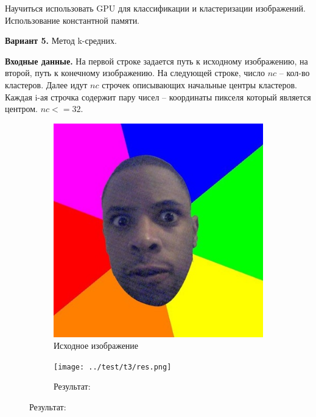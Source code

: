 \documentclass[12pt]{article}
\begin{document}


Научиться использовать GPU для классификации и
кластеризации изображений. Использование константной памяти.

\textbf{Вариант 5.} Метод k-средних.

\textbf{Входные данные.}
На первой строке задается путь к исходному изображению,
на второй, путь к конечному изображению. На следующей строке, число $nc$ -- кол-во
кластеров. Далее идут $nc$ строчек описывающих начальные центры кластеров. Каждая
i-ая строчка содержит пару чисел -- координаты пикселя который является центром.
$nc <= 32$.

\nvidia






{
	\scriptsize
}

\newpage



\begin{figure}[tbh]
	\caption*{Малое изображение: 400x408}
	\begin{subfigure}{0.49\textwidth}
		\centering
		\caption*{Исходное изображение}
		\includegraphics[scale=0.4]{../test/images/nigger.png}
	\end{subfigure}
	\begin{subfigure}{0.49\textwidth}
		\centering
		\caption*{Результат:}
		\texttt{[image: ../test/t3/res.png]}
	\end{subfigure}
\end{figure}
\end{document}
